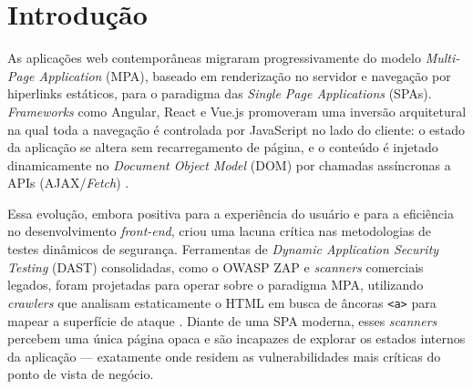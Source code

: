 \documentclass[
    12pt,
    openany,
    oneside,
    a4paper,
    brazil
]{abntex2}
\begin{document}

\frenchspacing

\pretextual

\imprimircapa
\imprimirfolhaderosto

\tableofcontents*
\cleardoublepage

\textual

\chapter{Introdução}

As aplicações web contemporâneas migraram progressivamente do modelo
\textit{Multi-Page Application} (MPA), baseado em renderização no
servidor e navegação por hiperlinks estáticos, para o paradigma das
\textit{Single Page Applications} (SPAs). \textit{Frameworks} como
Angular, React e Vue.js promoveram uma inversão arquitetural na qual
toda a navegação é controlada por JavaScript no lado do cliente: o
estado da aplicação se altera sem recarregamento de página, e o
conteúdo é injetado dinamicamente no \textit{Document Object Model}
(DOM) por chamadas assíncronas a APIs (AJAX/\textit{Fetch})
\cite{stackhawk2024, getastra2024}.

Essa evolução, embora positiva para a experiência do usuário e para a
eficiência no desenvolvimento \textit{front-end}, criou uma lacuna
crítica nas metodologias de testes dinâmicos de segurança. Ferramentas
de \textit{Dynamic Application Security Testing} (DAST) consolidadas,
como o OWASP ZAP e \textit{scanners} comerciais legados, foram
projetadas para operar sobre o paradigma MPA, utilizando
\textit{crawlers} que analisam estaticamente o HTML em busca de
âncoras \texttt{<a>} para mapear a superfície de ataque
\cite{brightsec2024}. Diante de uma SPA moderna, esses
\textit{scanners} percebem uma única página opaca e são incapazes de
explorar os estados internos da aplicação --- exatamente onde residem
as vulnerabilidades mais críticas do ponto de vista de negócio.
\end{document}
